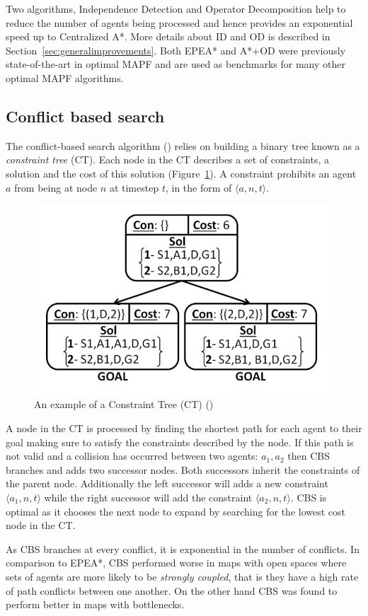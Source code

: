 \documentclass[a4paper,11pt]{article}
\begin{document}
Two algorithms, Independence Detection and Operator Decomposition help to reduce the number of agents being processed and hence provides an exponential speed up to Centralized A*. More details about ID and OD is described in Section~\ref{sec:generalimprovements}. Both EPEA* and A*+OD were previously state-of-the-art in optimal MAPF and are used as benchmarks for many other optimal MAPF algorithms.

\subsection{Conflict based search} \label{sec:cbs}
The conflict-based search algorithm (\cite{sharon2015conflict}) relies on building a binary tree known as a  \textit{constraint tree} (CT). Each node in the CT describes a set of constraints, a solution and the cost of this solution (Figure~\ref{fig:constraintree}). A constraint prohibits an agent $a$ from being at node $n$ at timestep $t$, in the form of $\langle a, n, t \rangle$.

\begin{figure}[!htb]
	\centering
	\centering
	\includegraphics[width=0.5\linewidth]{graphics/constrainttree}
	\caption{An example of a Constraint Tree (CT) (\cite{sharon2015conflict})}
	\label{fig:constraintree}
\end{figure}

A node in the CT is processed by finding the shortest path for each agent to their goal making sure to satisfy the constraints described by the node. If this path is not valid and a collision has occurred between two agents: $a_1, a_2$ then CBS branches and adds two successor nodes. Both successors inherit the constraints of the parent node. Additionally the left successor will adds a new constraint $\langle a_1, n, t \rangle$ while the right successor will add the constraint $\langle a_2, n, t \rangle$. CBS is optimal as it chooses the next node to expand by searching for the lowest cost node in the CT.


As CBS branches at every conflict, it is exponential in the number of conflicts. In comparison to EPEA*, CBS performed worse in maps with open spaces where sets of agents are more likely to be \textit{strongly coupled}, that is they have a high rate of path conflicts between one another. On the other hand CBS was found to perform better in maps with bottlenecks.
\end{document}
